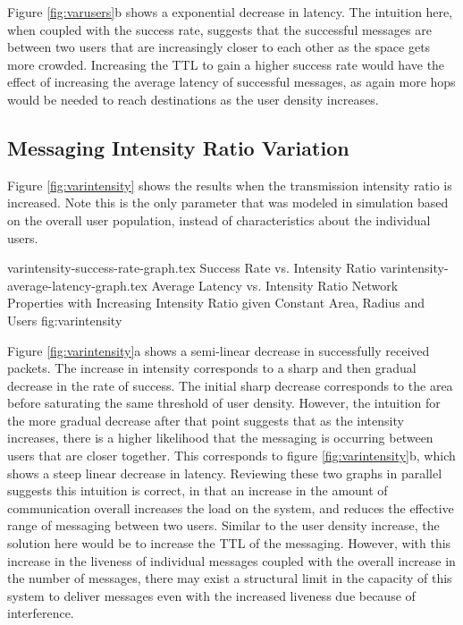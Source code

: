 Figure \ref{fig:varusers}b shows a exponential decrease in latency. The intuition here, when coupled
with the success rate, suggests that the successful messages are between two users that are 
increasingly closer to each other as the space gets more crowded. Increasing the TTL to gain a higher
success rate would have the effect of increasing the average latency of successful messages, as
again more hops would be needed to reach destinations as the user density increases.

\subsection{Messaging Intensity Ratio Variation}
Figure \ref{fig:varintensity} shows the results when the transmission intensity ratio is increased.
Note this is the only parameter that was modeled in simulation based on the overall user population, 
instead of characteristics about the individual users.

\sidebysidefigures
{varintensity-success-rate-graph.tex}      {Success Rate vs. Intensity Ratio}
{varintensity-average-latency-graph.tex}   {Average Latency vs. Intensity Ratio}
{Network Properties with Increasing Intensity Ratio given Constant Area, Radius and Users}
{fig:varintensity}

Figure \ref{fig:varintensity}a shows a semi-linear decrease in successfully received packets.
The increase in intensity corresponds to a sharp and then gradual decrease in the rate of success.
The initial sharp decrease corresponds to the area before saturating the same threshold of
user density. However, the intuition
for the more gradual decrease after that point suggests that as the intensity increases, there
is a higher likelihood that the messaging is occurring between users that are closer together.
This corresponds to figure \ref{fig:varintensity}b, which shows a steep linear decrease in latency.
Reviewing these two graphs in parallel suggests this intuition is correct, in that an increase
in the amount of communication overall increases the load on the system, and reduces the effective
range of messaging between two users. Similar to the user density increase, the solution here
would be to increase the TTL of the messaging. However, with this increase in the liveness of
individual messages coupled with the overall increase in the number of messages, there may exist
a structural limit in the capacity of this system to deliver messages even with the increased 
liveness due because of interference.
